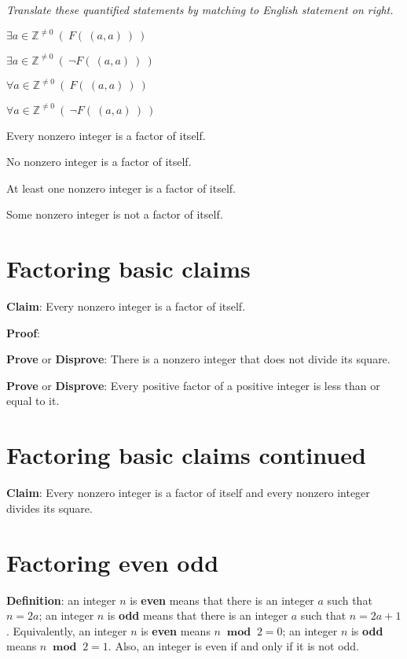 \documentclass[12pt, oneside]{article}
\begin{document}
{\it Translate these quantified statements by matching to English statement on right.}

\begin{multicols}{2}
$\exists a\in \mathbb{Z}^{\neq 0} ~(~F(~(a,a)~)~)$

$\exists a\in \mathbb{Z}^{\neq 0} ~(~\lnot F(~(a,a)~)~)$

$\forall a\in \mathbb{Z}^{\neq 0} ~(~F(~(a,a)~)~)$

$\forall a\in \mathbb{Z}^{\neq 0} ~(~\lnot F(~(a,a)~)~)$


Every nonzero integer is a factor of itself.

No nonzero integer is a factor of itself.

At least one nonzero integer is a factor of itself.

Some nonzero integer is not a factor of itself.
\end{multicols} \vfill
\section*{Factoring basic claims}


{\bf Claim}: Every nonzero integer is a factor of itself.

{\bf Proof}: 


\vspace{150pt}


{\bf Prove} or {\bf Disprove}: There is a nonzero integer that does not divide its square.



\vspace{150pt}

{\bf Prove} or {\bf Disprove}: Every positive factor of a positive integer is less than or equal to it.

\vspace{150pt}
 \vfill
\section*{Factoring basic claims continued}


{\bf Claim}: Every nonzero integer is a factor of itself and 
every nonzero integer divides its square.

\vspace{100pt}
 \vfill
\section*{Factoring even odd}


{\bf Definition}: an integer $n$ is {\bf even} means that there is an integer $a$ such that $n = 2a$; 
an integer $n$ is {\bf odd} means that there is an integer $a$ such that $n = 2a+1$.  Equivalently, 
an integer $n$ is {\bf even} means $n ~\textbf{ mod }~2 = 0$; an integer $n$ is {\bf odd} means $n ~\textbf{ mod }~2 = 1$.  
Also, an integer is even if and only if it is not odd.
 \vfill
\end{document}
